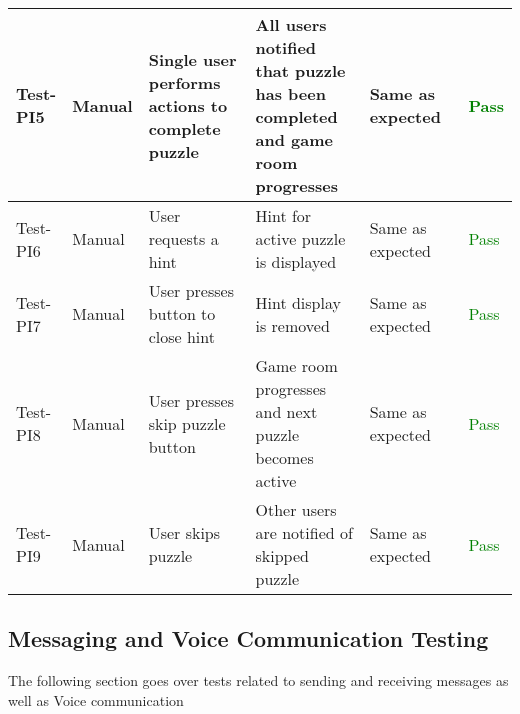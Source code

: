 \documentclass[12pt, titlepage]{article}
\begin{document}
\begin{table}[H]
{\begin{tabular}{|l|p{0.15\linewidth}|p{0.3\linewidth}|p{0.3\linewidth}|p{0.3\linewidth}|p{0.1\linewidth}|}
\hline
Test-PI5 & Manual & Single user performs actions to complete puzzle & All users notified that puzzle has been completed and game room progresses & Same as expected & \textcolor{Green}{Pass} \\
\hline
Test-PI6 & Manual & User requests a hint & Hint for active puzzle is displayed & Same as expected & \textcolor{Green}{Pass} \\
\hline
Test-PI7 & Manual & User presses button to close hint & Hint display is removed & Same as expected & \textcolor{Green}{Pass} \\
\hline
Test-PI8 & Manual & User presses skip puzzle button & Game room progresses and next puzzle becomes active & Same as expected & \textcolor{Green}{Pass} \\
\hline
Test-PI9 & Manual & User skips puzzle & Other users are notified of skipped puzzle & Same as expected & \textcolor{Green}{Pass} \\
\hline
\end{tabular}}
\label{table:PI1}
\end{table}

\subsection{Messaging and Voice Communication Testing}
The following section goes over tests related to sending and receiving messages as well as Voice communication
\end{document}
